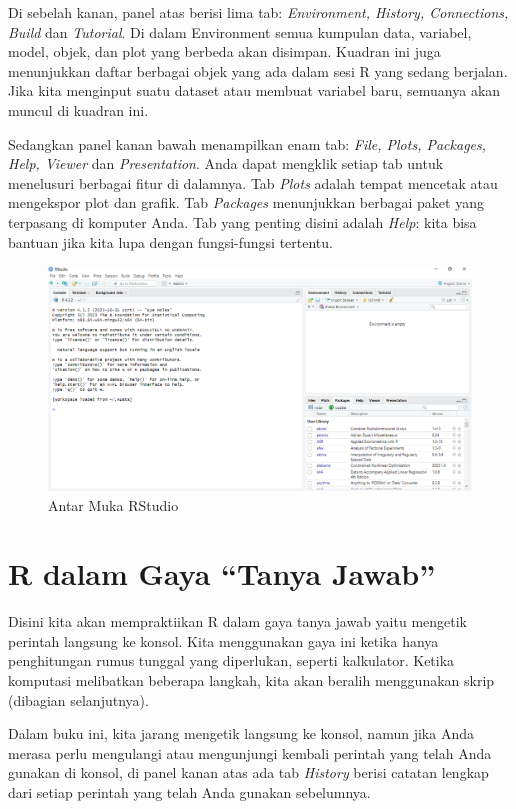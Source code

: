 \documentclass[a4paper, nobind]{templates/ociamthesis}
\begin{document}
Di sebelah kanan, panel atas berisi lima tab: \emph{Environment, History, Connections, Build} dan \emph{Tutorial}. Di dalam Environment semua kumpulan data, variabel, model, objek, dan plot yang berbeda akan disimpan. Kuadran ini juga menunjukkan daftar berbagai objek yang ada dalam sesi R yang sedang berjalan. Jika kita menginput suatu dataset atau membuat variabel baru, semuanya akan muncul di kuadran ini.

Sedangkan panel kanan bawah menampilkan enam tab: \emph{File, Plots, Packages, Help, Viewer} dan \emph{Presentation}. Anda dapat mengklik setiap tab untuk menelusuri berbagai fitur di dalamnya. Tab \emph{Plots} adalah tempat mencetak atau mengekspor plot dan grafik. Tab \emph{Packages} menunjukkan berbagai paket yang terpasang di komputer Anda. Tab yang penting disini adalah \emph{Help}: kita bisa bantuan jika kita lupa dengan fungsi-fungsi tertentu.

\begin{figure}[H]
\includegraphics[width=1\linewidth]{figures/3qu} \caption{Antar Muka RStudio}\label{fig:3qu}
\end{figure}

\hypertarget{r-dalam-gaya-tanya-jawab}{%
\section{R dalam Gaya ``Tanya Jawab''}\label{r-dalam-gaya-tanya-jawab}}

Disini kita akan mempraktiikan R dalam gaya tanya jawab yaitu mengetik perintah langsung ke konsol. Kita menggunakan gaya ini ketika hanya penghitungan rumus tunggal yang diperlukan, seperti kalkulator. Ketika komputasi melibatkan beberapa langkah, kita akan beralih menggunakan skrip (dibagian selanjutnya).

Dalam buku ini, kita jarang mengetik langsung ke konsol, namun jika Anda merasa perlu mengulangi atau mengunjungi kembali perintah yang telah Anda gunakan di konsol, di panel kanan atas ada tab \emph{History} berisi catatan lengkap dari setiap perintah yang telah Anda gunakan sebelumnya.
\end{document}
